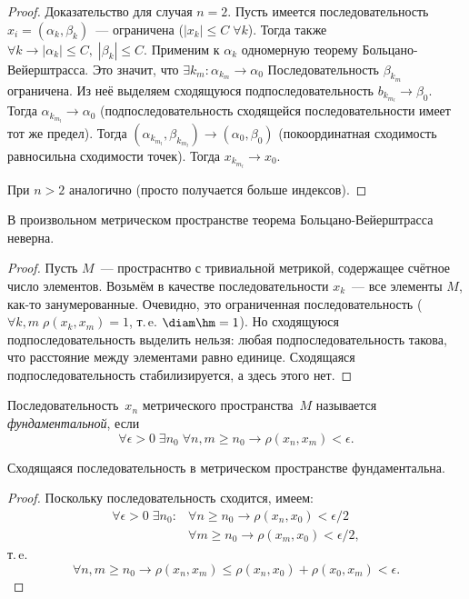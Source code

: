 \begin{proof}
Доказательство для случая \(n = 2\). Пусть имеется последовательность \(x_i =
(\alpha_k, \beta_k)\)~--- ограничена (\(|x_k| \leq C \; \forall k\)). Тогда
также \(\forall k \rightarrow |\alpha_k| \leq C, \; |\beta_k| \leq C\). Применим
к \(\alpha_k\) одномерную теорему Больцано-Вейерштрасса. Это значит, что
\(\exists k_m \colon \alpha_{k_m} \rightarrow \alpha_0\) Последовательность
\(\beta_{k_m}\) ограничена. Из неё выделяем сходящуюся подпоследовательность
\(b_{k_{m_l}} \rightarrow \beta_0\). Тогда \(\alpha_{k_{m_l}} \rightarrow
\alpha_0\) (подпоследовательность сходящейся последовательности имеет тот же
предел). Тогда \((\alpha_{k_{m_l}}, \beta_{k_{m_l}}) \rightarrow
(\alpha_0, \beta_0)\) (покоординатная сходимость равносильна сходимости точек).
Тогда \(x_{k_{m_l}} \rightarrow x_0\).

При \(n > 2\) аналогично (просто получается больше индексов).
\end{proof}

В произвольном метрическом пространстве теорема Больцано-Вейерштрасса неверна.
\begin{proof}
Пусть \(M\)~--- простраснтво с тривиальной метрикой, содержащее счётное число
элементов. Возьмём в качестве последовательности \(x_k\)~--- все элементы \(M\),
как-то занумерованные. Очевидно, это ограниченная последовательность (\(\forall
k, m \; \rho(x_k, x_m) = 1\), т.\,e. \(\diam \hm = 1\)). Но сходящуюся
подпоследовательность выделить нельзя: любая подпоследовательность такова, что
расстояние между элементами равно единице. Сходящаяся подпоследовательность
стабилизируется, а здесь этого нет.
\end{proof}

\begin{definition}
Последовательность~\(x_n\) метрического пространства~\(M\) называется
\textit{фундаментальной}, если
\[
    \forall \epsilon > 0 \; \exists n_0 \; \forall n, m \geq n_0 \rightarrow
        \rho(x_n, x_m) < \epsilon.
\]
\end{definition}

\begin{statement}
Сходящаяся последовательность в метрическом пространстве фундаментальна.
\end{statement}

\begin{proof}
Поскольку последовательность сходится, имеем:
\begin{align}
    \forall \epsilon > 0 \;\exists n_0 \colon &\forall n \geq n_0 \rightarrow
        \rho(x_n, x_0) < \epsilon / 2\\
    &\forall m \geq n_0 \rightarrow \rho(x_m, x_0) < \epsilon / 2,
\end{align}
т.\,e.
\[
    \forall n, m \geq n_0 \rightarrow \rho(x_n, x_m) \leq \rho(x_n, x_0) +
        \rho(x_0, x_m) < \epsilon.
\]
\end{proof}

